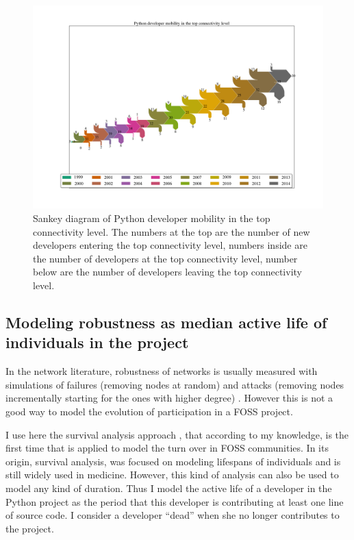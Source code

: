 \begin{landscape}
\begin{figure}[p]
\begin{center}
\includegraphics[scale=0.42]{figures/sankey_mobility_python_years}
\caption[Sankey diagram of Python developer mobility in the top connectivity level.]{Sankey diagram of Python developer mobility in the top connectivity level. The numbers at the top are the number of new developers entering the top connectivity level, numbers inside are the number of developers at the top connectivity level, number below are the number of developers leaving the top connectivity level.}
\label{fig:sankey}
\end{center}
\end{figure}
\end{landscape}


\subsection{Modeling robustness as median active life of individuals in the project}

In the network literature, robustness of networks is usually measured with simulations of failures (removing nodes at random) and attacks (removing nodes incrementally starting for the ones with higher degree) \citep{albert:2000}. However this is not a good way to model the evolution of participation in a FOSS project.

I use here the survival analysis approach \citep{miller:2011}, that according to my knowledge, is the first time that is applied to model the turn over in FOSS communities. In its origin, survival analysis, was focused on modeling lifespans of individuals and is still widely used in medicine. However, this kind of analysis can also be used to model any kind of duration. Thus I model the active life of a developer in the Python project as the period that this developer is contributing at least one line of source code. I consider a developer ``dead'' when she no longer contributes to the project.

